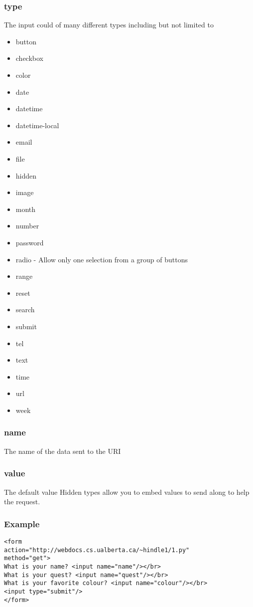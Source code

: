 \documentclass[../CMPUT-404-Notes.tex]{subfiles}
\begin{document}
\subsubsection{type} 
The input could of many different types including but not limited to
\begin{itemize}
  \item button 
  \item checkbox 
  \item color 
  \item date 
  \item datetime 
  \item datetime-local 
  \item email 
  \item file 
  \item hidden 
  \item image 
  \item month 
  \item number 
  \item password 
  \item radio - Allow only one selection from a group of buttons
  \item range 
  \item reset 
  \item search 
  \item submit 
  \item tel 
  \item text 
  \item time 
  \item url 
  \item week
\end{itemize}

\subsubsection{name}
The name of the data sent to the URI
\subsubsection{value}
The default value Hidden types allow you to embed values to send along to help the request. 
\subsubsection{Example}
\begin{verbatim}
<form 
action="http://webdocs.cs.ualberta.ca/~hindle1/1.py"  
method="get">
What is your name? <input name="name"/></br>
What is your quest? <input name="quest"/></br>
What is your favorite colour? <input name="colour"/></br>
<input type="submit"/>
</form>
\end{verbatim}
\end{document}

